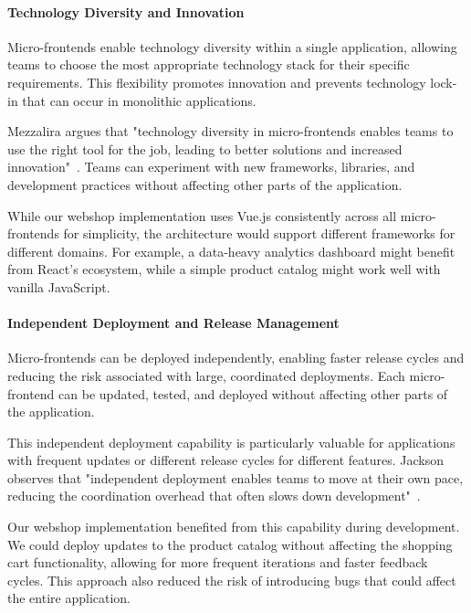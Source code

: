 \documentclass[12pt,a4paper]{report}
\begin{document}
\paragraph{Technology Diversity and Innovation}

Micro-frontends enable technology diversity within a single application, allowing teams to choose the most appropriate technology stack for their specific requirements. This flexibility promotes innovation and prevents technology lock-in that can occur in monolithic applications.

Mezzalira argues that "technology diversity in micro-frontends enables teams to use the right tool for the job, leading to better solutions and increased innovation"~\cite{mezzalira2021building}. Teams can experiment with new frameworks, libraries, and development practices without affecting other parts of the application.

While our webshop implementation uses Vue.js consistently across all micro-frontends for simplicity, the architecture would support different frameworks for different domains. For example, a data-heavy analytics dashboard might benefit from React's ecosystem, while a simple product catalog might work well with vanilla JavaScript.

\paragraph{Independent Deployment and Release Management}

Micro-frontends can be deployed independently, enabling faster release cycles and reducing the risk associated with large, coordinated deployments. Each micro-frontend can be updated, tested, and deployed without affecting other parts of the application.

This independent deployment capability is particularly valuable for applications with frequent updates or different release cycles for different features. Jackson observes that "independent deployment enables teams to move at their own pace, reducing the coordination overhead that often slows down development"~\cite{jackson2016microfrontends}.

Our webshop implementation benefited from this capability during development. We could deploy updates to the product catalog without affecting the shopping cart functionality, allowing for more frequent iterations and faster feedback cycles. This approach also reduced the risk of introducing bugs that could affect the entire application.
\end{document}
